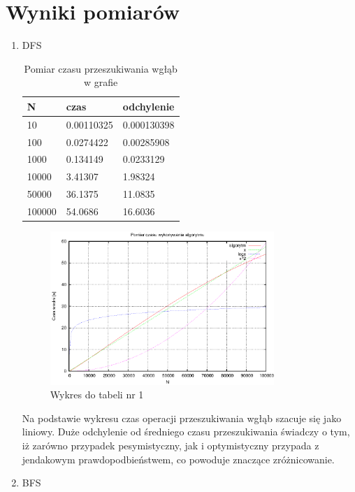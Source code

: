 \documentclass[a4paper,11pt]{article}
\begin{document}
\section{Wyniki pomiarów}
\begin{enumerate}
 \item DFS
   
  \begin{table}[th]
  \centering
    \caption{Pomiar czasu przeszukiwania wgłąb w grafie}

      \begin{tabular}{|l|l|l|}
	\hline
	N & czas & odchylenie \\
    \hline
 10 & 0.00110325 & 0.000130398\\
 \hline
100 & 0.0274422 & 0.00285908\\
\hline
1000 & 0.134149 & 0.0233129\\
\hline
10000 & 3.41307 & 1.98324\\
\hline
50000 & 36.1375 & 11.0835\\
\hline
100000 & 54.0686 & 16.6036\\
\hline
    \end{tabular}
    \end{table}
    \newpage
 \begin{figure}[th]
\centering
\includegraphics[width=0.8\textwidth]{../prj/wykres13.eps}
\caption{Wykres do tabeli nr 1}
\label{Wykres do tabeli nr 1}
\end{figure} 
Na podstawie wykresu czas operacji przeszukiwania wgłąb szacuje się jako liniowy. Duże odchylenie od średniego czasu przeszukiwania świadczy o tym,
 iż zarówno przypadek pesymistyczny, jak i optymistyczny przypada z jendakowym prawdopodbieństwem, co powoduje znaczące zróżnicowanie.
\item BFS
  \begin{table}[th]
  \centering
  

\end{table}
\end{enumerate}
\end{document}
